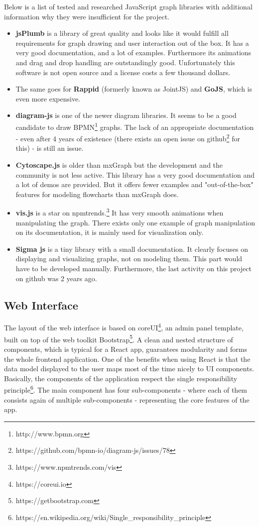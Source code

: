 \documentclass[a4paper,12pt,pdftex,halfparskip,cleardoubleempty,bibtotoc,liststotoc]{scrbook}
\begin{document}
Below is a list of tested and researched JavaScript graph libraries with additional information why they were insufficient for the project.
\begin{itemize}
	\item \textbf{jsPlumb} is a library of great quality and looks like it would fulfill all  requirements for graph drawing and user interaction out of the box. It has a very good documentation, and a lot of examples. Furthermore its animations and drag and drop handling are outstandingly good. Unfortunately this software is not open source and a license costs a few thousand dollars.
	\item The same goes for \textbf{Rappid} (formerly known as JointJS) and \textbf{GoJS}, which is even more expensive.
	\item \textbf{diagram-js} is one of the newer diagram libraries. It seems to be a good candidate to draw BPMN\footnote{http://www.bpmn.org} graphs. The lack of an appropriate documentation - even after 4 years of existence (there exists an open issue on github\footnote{https://github.com/bpmn-io/diagram-js/issues/78} for this) - is still an issue.
	\item \textbf{Cytoscape.js} is older than mxGraph but the development and the community is not less active. This library has a very good documentation and a lot of demos are provided. But it offers fewer examples and "out-of-the-box" features for modeling flowcharts than mxGraph does.
	\item \textbf{vis.js} is a star on npmtrends.\footnote{https://www.npmtrends.com/vis}  It has very smooth animations when manipulating the graph. There exists only one example of graph manipulation on its documentation, it is mainly used for visualization only.
	\item \textbf{Sigma js} is a tiny library with a small documentation. It clearly focuses on displaying and visualizing graphs, not on modeling them. This part would have to be developed manually. Furthermore, the last activity on this project on github was 2 years ago.
\end{itemize}

\subsection{Web Interface}

The layout of the web interface is based on coreUI\footnote{https://coreui.io}, an admin panel template, built on top of the web toolkit Bootstrap\footnote{https://getbootstrap.com}. A clean and nested structure of components, which is typical for a React app, guarantees modularity and forms the whole frontend application. One of the benefits when using React is that the data model displayed to the user maps most of the time nicely to UI components. Basically, the components of the application respect the single responsibility principle\footnote{https://en.wikipedia.org/wiki/Single\_responsibility\_principle}. The main component has four sub-components - where each of them consists again of multiple sub-components - representing the core features of the app.
\end{document}
